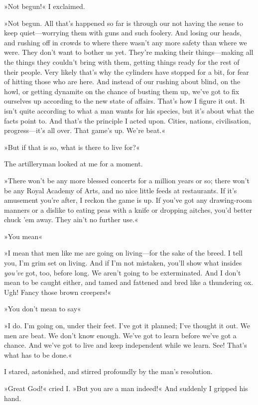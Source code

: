 »Not begun!« I exclaimed.

»Not begun. All that's happened so far is through our not having the sense to keep quiet—worrying them with guns and such foolery. And losing our heads, and rushing off in crowds to where there wasn't any more safety than where we were. They don't want to bother us yet. They're making their things—making all the things they couldn't bring with them, getting things ready for the rest of their people. Very likely that's why the cylinders have stopped for a bit, for fear of hitting those who are here. And instead of our rushing about blind, on the howl, or getting dynamite on the chance of busting them up, we've got to fix ourselves up according to the new state of affairs. That's how I figure it out. It isn't quite according to what a man wants for his species, but it's about what the facts point to. And that's the principle I acted upon. Cities, nations, civilisation, progress—it's all over. That game's up. We're beat.«

»But if that is so, what is there to live for?«

The artilleryman looked at me for a moment.

»There won't be any more blessed concerts for a million years or so; there won't be any Royal Academy of Arts, and no nice little feeds at restaurants. If it's amusement you're after, I reckon the game is up. If you've got any drawing-room manners or a dislike to eating peas with a knife or dropping aitches, you'd better chuck 'em away. They ain't no further use.«

»You mean\longdash«

»I mean that men like me are going on living—for the sake of the breed. I tell you, I'm grim set on living. And if I'm not mistaken, you'll show what insides \textit{you've} got, too, before long. We aren't going to be exterminated. And I don't mean to be caught either, and tamed and fattened and bred like a thundering ox. Ugh! Fancy those brown creepers!«

»You don't mean to say\longdash«

»I do. I'm going on, under their feet. I've got it planned; I've thought it out. We men are beat. We don't know enough. We've got to learn before we've got a chance. And we've got to live and keep independent while we learn. See! That's what has to be done.«

I stared, astonished, and stirred profoundly by the man's resolution.

»Great God!« cried I. »But you are a man indeed!« And suddenly I gripped his hand.

